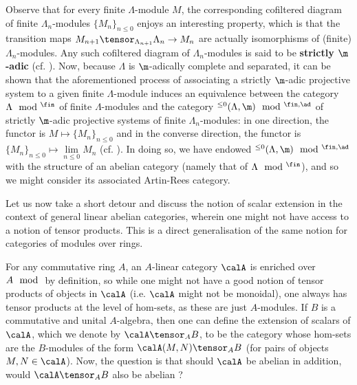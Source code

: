         \begin{remark} \label{remark: adic_projective_systems}
            Observe that for every finite $\Lambda$-module $M$, the corresponding cofiltered diagram of finite $\Lambda_n$-modules $\{M_n\}_{n \leq 0}$ enjoys an interesting property, which is that the transition maps $M_{n + 1} \tensor_{\Lambda_{n + 1}} \Lambda_n \to M_n$ are actually isomorphisms of (finite) $\Lambda_n$-modules. Any such cofiltered diagram of $\Lambda_n$-modules is said to be \textbf{strictly $\m$-adic} (cf. \cite[Definition 1.4.1.1]{conrad_etale_cohomology}). Now, because $\Lambda$ is $\m$-adically complete and separated, it can be shown that the aforementioned process of associating a strictly $\m$-adic projective system to a given finite $\Lambda$-module induces an equivalence between the category $\Lambda\mod^{\fin}$ of finite $\Lambda$-modules and the category ${}^{\leq 0}(\Lambda, \m)\mod^{\fin, \ad}$ of strictly $\m$-adic projective systems of finite $\Lambda_n$-modules: in one direction, the functor is $M \mapsto \{M_n\}_{n \leq 0}$ and in the converse direction, the functor is $\{M_n\}_{n \leq 0} \mapsto \underset{n \leq 0}{\lim} M_n$ (cf. \cite[\href{https://stacks.math.columbia.edu/tag/031D}{Tag 031D}]{stacks}). In doing so, we have endowed ${}^{\leq 0}(\Lambda, \m)\mod^{\fin, \ad}$ with the structure of an abelian category (namely that of $\Lambda\mod^{\fin}$), and so we might consider its associated Artin-Rees category.
        \end{remark}
        Let us now take a short detour and discuss the notion of scalar extension in the context of general linear abelian categories, wherein one might not have access to a notion of tensor products. This is a direct generalisation of the same notion for categories of modules over rings. 
        \begin{remark} \label{remark: extension_of_scalar_for_linear_abelian_categories}
            For any commutative ring $A$, an $A$-linear category $\calA$ is enriched over $A\mod$ by definition, so while one might not have a good notion of tensor products of objects in $\calA$ (i.e. $\calA$ might not be monoidal), one always has tensor products at the level of hom-sets, as these are just $A$-modules. If $B$ is a commutative and unital $A$-algebra, then one can define the extension of scalars of $\calA$, which we denote by $\calA \tensor_A B$, to be the category whose hom-sets are the $B$-modules of the form $\calA(M, N) \tensor_A B$ (for pairs of objects $M, N \in \calA$). Now, the question is that should $\calA$ be abelian in addition, would $\calA \tensor_A B$ also be abelian ? 
        \end{remark}

